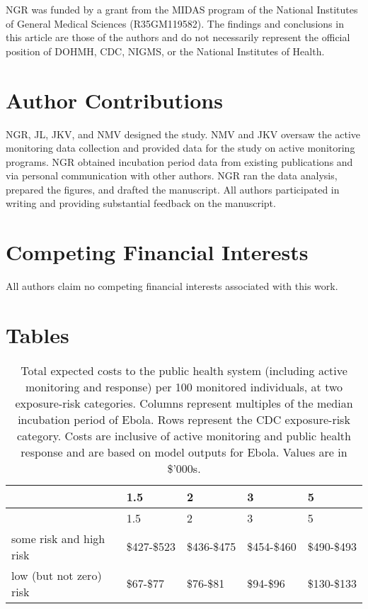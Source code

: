 \documentclass[]{article}
\begin{document}
NGR was funded by a grant from the MIDAS program of the National
Institutes of General Medical Sciences (R35GM119582). The findings and
conclusions in this article are those of the authors and do not
necessarily represent the official position of DOHMH, CDC, NIGMS, or the
National Institutes of Health.

\section{Author Contributions}\label{author-contributions}

NGR, JL, JKV, and NMV designed the study. NMV and JKV oversaw the active
monitoring data collection and provided data for the study on active
monitoring programs. NGR obtained incubation period data from existing
publications and via personal communication with other authors. NGR ran
the data analysis, prepared the figures, and drafted the manuscript. All
authors participated in writing and providing substantial feedback on
the manuscript.

\section{Competing Financial
Interests}\label{competing-financial-interests}

All authors claim no competing financial interests associated with this
work.

\section{Tables}\label{tables}

\begin{longtable}[]{@{}lllll@{}}
\caption{Total expected costs to the public health system (including
active monitoring and response) per 100 monitored individuals, at two
exposure-risk categories. Columns represent multiples of the median
incubation period of Ebola. Rows represent the CDC exposure-risk
category. Costs are inclusive of active monitoring and public health
response and are based on model outputs for Ebola. Values are in
\$'000s.}\tabularnewline
\toprule
& 1.5 & 2 & 3 & 5\tabularnewline
\midrule
\endfirsthead
\toprule
& 1.5 & 2 & 3 & 5\tabularnewline
\midrule
\endhead
some risk and high risk & \$427-\$523 & \$436-\$475 & \$454-\$460 &
\$490-\$493\tabularnewline
low (but not zero) risk & \$67-\$77 & \$76-\$81 & \$94-\$96 &
\$130-\$133\tabularnewline
\bottomrule
\end{longtable}
\end{document}
